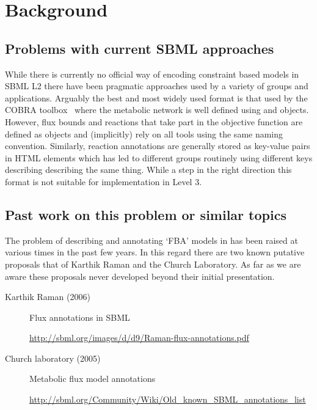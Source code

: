 
\section{ Background }
\label{background}

\subsection{ Problems with current SBML approaches }

While there is currently no official way of encoding constraint based models in SBML L2 there have been pragmatic approaches used by a variety of groups and applications. Arguably the best and most widely used format is that used by the \textsf{COBRA toolbox}~\citep{cobra} where the metabolic network is well defined using \SBML \Reaction and \Species objects. However, flux bounds and reactions that take part in the objective function are defined as \LocalParameter objects and (implicitly) rely on all tools using the same naming convention. Similarly, reaction annotations are generally stored as key-value pairs in HTML \Notes elements which has led to different groups routinely using different keys describing describing the same thing. While a step in the right direction this format is not suitable for implementation in \SBML Level 3.


\subsection{ Past work on this problem or similar topics }
The problem of describing and annotating `FBA' models in \SBML has been raised  at various times in the past few years. In this regard there are two known putative proposals that of Karthik Raman and the Church Laboratory. As far as we are aware these proposals never developed beyond their initial presentation.

\begin{description}
  \item[Karthik Raman (2006)] Flux annotations in SBML
  \item[]\url{http://sbml.org/images/d/d9/Raman-flux-annotations.pdf}
  \item[Church laboratory (2005)] Metabolic flux model annotations
  \item[]\url{http://sbml.org/Community/Wiki/Old_known_SBML_annotations_list}
\end{description}

